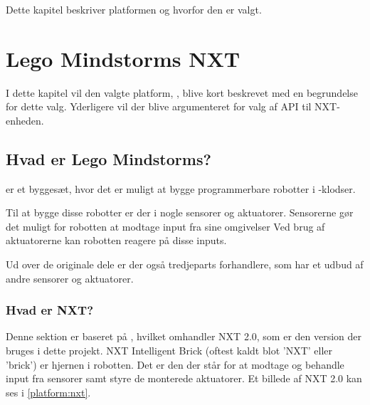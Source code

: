 
Dette kapitel beskriver platformen og hvorfor den er valgt.

\section{Lego Mindstorms NXT}\label{lego:mindstorms-nxt}
I dette kapitel vil den valgte platform, \legoms, blive kort beskrevet med en begrundelse for dette valg.
Yderligere vil der blive argumenteret for valg af API til NXT-enheden.

\subsection{Hvad er Lego Mindstorms?}
\legoms er et byggesæt, hvor det er muligt at bygge programmerbare robotter i \lego-klodser.

Til at bygge disse robotter er der i \legoms nogle sensorer og aktuatorer. Sensorerne gør det muligt for robotten at modtage input fra sine omgivelser
Ved brug af aktuatorerne kan robotten reagere på disse inputs.

Ud over de originale \lego dele er der også tredjeparts forhandlere, som har et udbud af andre sensorer og aktuatorer. 

\subsubsection{Hvad er NXT?}
Denne sektion er baseret på \cite{nxt}, hvilket omhandler NXT 2.0, som er den version der bruges i dette projekt.
NXT Intelligent Brick (oftest kaldt blot 'NXT' eller 'brick') er hjernen i \legoms robotten.
Det er den der står for at modtage og behandle input fra sensorer samt styre de monterede aktuatorer.
Et billede af NXT 2.0 kan ses i \cref{platform:nxt}.

